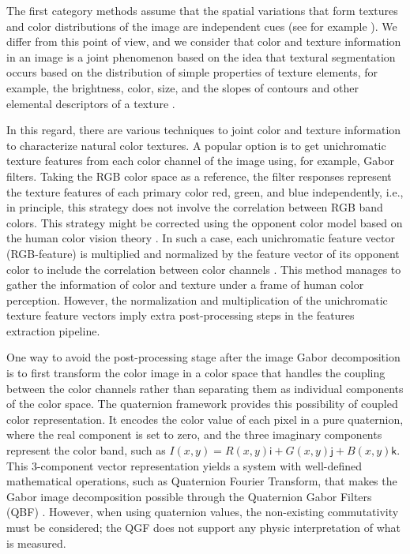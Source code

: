 The first category methods assume that the spatial variations that form textures and color distributions of the image are independent cues (see for example \citep{Permuter.Francos.ea:PR:2006}). We differ from this point of view, and we consider that color and texture information in an image is a joint phenomenon based on the idea that textural segmentation occurs based on the distribution of simple properties of texture elements, for example, the brightness, color, size, and the slopes of contours and other elemental descriptors of a texture \citep{Werner.Chalupa:Book:2004}.
 
In this regard, there are various techniques to joint color and texture information to characterize natural color textures. A popular option is to get unichromatic texture features from each color channel of the image using, for example, Gabor filters. Taking the RGB color space as a reference, the filter responses represent the texture features of each primary color red, green, and blue independently, i.e., in principle, this strategy does not involve the correlation between RGB band colors. This strategy might be corrected using the opponent color model based on the human color vision theory \citep{Jain.Healey:TIP:1998}. In such a case, each unichromatic feature vector (RGB-feature) is multiplied and normalized by the feature vector of its opponent color to include the correlation between color channels \citep{Palm.Keysers.ea:JCIS:2000}. This method manages to gather the information of color and texture under a frame of human color perception. However, the normalization and multiplication of the unichromatic texture feature vectors imply extra post-processing steps in the features extraction pipeline.  

One way to avoid the post-processing stage after the image Gabor decomposition is to first transform the color image in a color space that handles the coupling between the color channels rather than separating them as individual components of the color space. The quaternion framework \citep{Sangwine.Ell:VISP:2000} provides this possibility of coupled color representation. It encodes the color value of each pixel in a pure quaternion, where the real component is set to zero, and the three imaginary components represent the color band, such as $I(x, y) = R (x, y) \mathsf{i} + G (x, y) \mathsf{j} + B (x, y) \mathsf{k}$. This 3-component vector representation yields a system with well-defined mathematical operations, such as Quaternion Fourier Transform, that makes the Gabor image decomposition possible through the Quaternion Gabor Filters (QBF) \citep{Subakan.Vemuri:EMMCVPR:2009}. However, when using quaternion values, the non-existing commutativity must be considered; the QGF does not support any physic interpretation of what is measured. 


